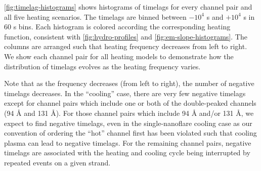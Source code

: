 \autoref{fig:timelag-histograms} shows histograms of timelags for every channel pair and all five heating scenarios. The timelags are binned between $-10^4$ s and $+10^4$ s in 60 s bins. Each histogram is colored according the corresponding heating function, consistent with \autoref{fig:hydro-profiles} and \autoref{fig:em-slope-histograms}. The columns are arranged such that heating frequency decreases from left to right. We show each channel pair for all heating models to demonstrate how the distribution of timelags evolves as the heating frequency varies.

Note that as the frequency decreases (from left to right), the number of negative timelags decreases. In the ``cooling'' case, there are very few negative timelags except for channel pairs which include one or both of the double-peaked channels (94 \AA{} and 131 \AA{}). For those channel pairs which include 94 \AA{} and/or 131 \AA{}, we expect to find negative timelags, even in the single-nanoflare cooling case as our convention of ordering the ``hot'' channel first has been violated such that cooling plasma can lead to negative timelags. For the remaining channel pairs, negative timelags are associated with the heating and cooling cycle being interrupted by repeated events on a given strand.
